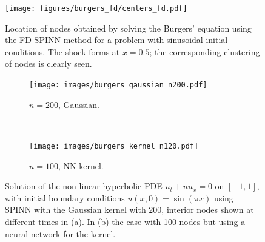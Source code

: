 \documentclass[12pt]{article}
\begin{document}
\begin{figure}
\centering
\texttt{[image: figures/burgers\_fd/centers\_fd.pdf]}
\caption{Location of nodes obtained by solving the Burgers' equation using the FD-SPINN method for a problem with sinusoidal initial conditions. The shock forms at $x=0.5$; the corresponding clustering of nodes is clearly seen.}
\label{fig:burgers_nodes}
\end{figure}

\begin{figure}
\centering
\begin{subfigure}{0.45\textwidth}
\texttt{[image: images/burgers\_gaussian\_n200.pdf]}
\caption{$n = 200$, Gaussian.}
\label{fig:spinn_burgers_a}
\end{subfigure}
~
\begin{subfigure}{0.45\textwidth}
\texttt{[image: images/burgers\_kernel\_n120.pdf]}
\caption{$n = 100$, NN kernel.}
\label{fig:spinn_burgers_c}
\end{subfigure}
\caption{Solution of the non-linear hyperbolic PDE $u_t + u u_x = 0$ on $[-1,1]$, with initial boundary conditions $u(x, 0) = \sin(\pi x)$ using SPINN with the Gaussian kernel with $200$, interior nodes shown at different times in (a). In (b) the case with 100 nodes but using a neural network for the kernel. }
\label{fig:spinn_burgers}
\end{figure}
\end{document}
